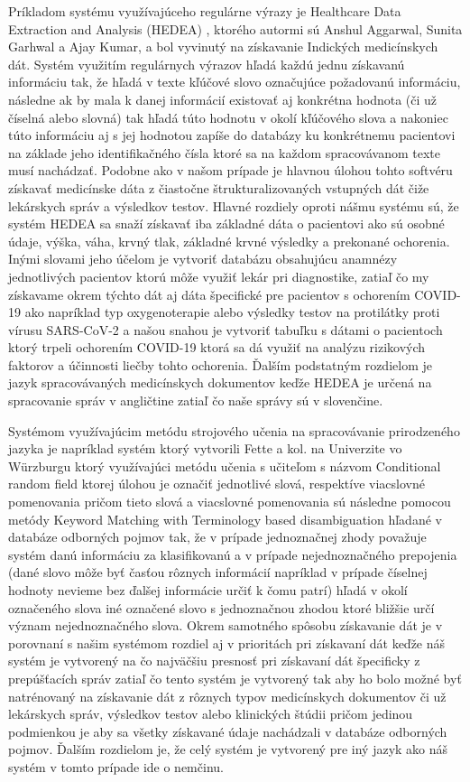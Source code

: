 Príkladom systému využívajúceho regulárne výrazy je Healthcare Data Extraction and Analysis (HEDEA) \cite{hedea}, ktorého
autormi sú Anshul Aggarwal, Sunita Garhwal a Ajay Kumar, 
a bol vyvinutý na získavanie Indických medicínskych dát.
Systém využitím regulárnych výrazov hľadá každú jednu
získavanú informáciu tak, že hľadá v texte kľúčové slovo
označujúce požadovanú informáciu, následne ak by mala 
k danej informácií existovať aj konkrétna hodnota
(či už číselná alebo slovná) tak hľadá túto hodnotu v okolí
kľúčového slova a nakoniec túto informáciu aj 
s jej hodnotou zapíše do databázy ku konkrétnemu 
pacientovi na základe jeho identifikačného
čísla ktoré sa na každom spracovávanom texte musí nachádzať. 
Podobne ako v našom prípade je hlavnou úlohou tohto 
softvéru získavať medicínske dáta z čiastočne štrukturalizovaných
vstupných dát čiže lekárskych správ a výsledkov testov.
Hlavné rozdiely oproti nášmu systému sú, že systém HEDEA
sa snaží získavať iba základné dáta o pacientovi ako sú osobné
údaje, výška, váha, krvný tlak, základné krvné výsledky a 
prekonané ochorenia. Inými slovami jeho účelom je vytvoriť
databázu obsahujúcu anamnézy jednotlivých pacientov
ktorú môže využiť lekár pri diagnostike,
zatiaľ čo my získavame okrem týchto dát aj dáta 
špecifické pre pacientov s ochorením COVID-19 ako
napríklad typ oxygenoterapie alebo výsledky testov
na protilátky proti vírusu SARS-CoV-2 a našou snahou je 
vytvoriť tabuľku s dátami o pacientoch ktorý trpeli ochorením COVID-19 ktorá
sa dá využiť na analýzu rizikových faktorov a účinnosti liečby tohto ochorenia. Ďalším podstatným rozdielom je jazyk spracovávaných medicínskych dokumentov keďže HEDEA je určená na spracovanie správ v angličtine zatiaľ čo naše správy sú v slovenčine.

Systémom využívajúcim metódu strojového učenia na
spracovávanie prirodzeného jazyka je napríklad 
systém ktorý vytvorili Fette a kol. na Univerzite
vo Würzburgu \cite{infExtGer} ktorý využívajúci metódu učenia s 
učiteľom s názvom Conditional random field ktorej úlohou
je označiť jednotlivé slová, respektíve viacslovné
pomenovania \cite{CRF} pričom tieto slová a viacslovné pomenovania sú následne pomocou metódy 
Keyword Matching with Terminology based disambiguation
hľadané v databáze
odborných pojmov tak, že v prípade jednoznačnej zhody 
považuje systém danú informáciu za klasifikovanú a v
prípade nejednoznačného prepojenia (dané slovo môže byť časťou
rôznych informácií napríklad v prípade číselnej hodnoty nevieme
bez ďalšej informácie určiť k čomu patrí) hľadá v okolí označeného 
slova iné označené slovo s jednoznačnou zhodou ktoré bližšie 
určí význam nejednoznačného slova. Okrem samotného spôsobu
získavanie dát je v porovnaní s našim systémom rozdiel 
aj v prioritách pri získavaní dát keďže náš systém 
je vytvorený na čo najväčšiu presnosť pri získavaní
dát špecificky z prepúšťacích správ zatiaľ čo tento 
systém je vytvorený tak aby ho bolo možné byť natrénovaný na 
získavanie dát z rôznych typov medicínskych dokumentov či už
lekárskych správ, výsledkov testov alebo klinických 
štúdii pričom jedinou podmienkou je aby sa všetky získavané údaje 
nachádzali v databáze odborných pojmov. Ďalším rozdielom je, 
že celý systém je vytvorený 
pre iný jazyk ako náš systém v tomto prípade ide o 
nemčinu. 


